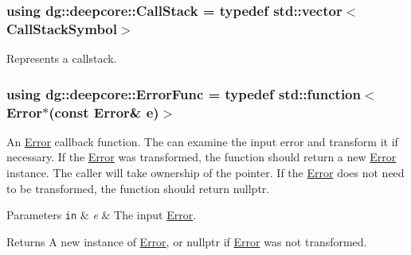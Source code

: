 \subsubsection[{\texorpdfstring{Call\+Stack}{CallStack}}]{\setlength{\rightskip}{0pt plus 5cm}using {\bf dg\+::deepcore\+::\+Call\+Stack} = typedef std\+::vector$<$Call\+Stack\+Symbol$>$}\hypertarget{group___utility_module_gabdf2d70ae3aab3c57142eddec69a725c}{}\label{group___utility_module_gabdf2d70ae3aab3c57142eddec69a725c}


Represents a callstack. 

\subsubsection[{\texorpdfstring{Error\+Func}{ErrorFunc}}]{\setlength{\rightskip}{0pt plus 5cm}using {\bf dg\+::deepcore\+::\+Error\+Func} = typedef std\+::function$<$Error$\ast$(const Error\& e)$>$}\hypertarget{group___utility_module_gaa93ea71a4ed4c044369d3b323aec4435}{}\label{group___utility_module_gaa93ea71a4ed4c044369d3b323aec4435}


An \hyperlink{classdg_1_1deepcore_1_1_error}{Error} callback function. The can examine the input error and transform it if necessary. If the \hyperlink{classdg_1_1deepcore_1_1_error}{Error} was transformed, the function should return a new \hyperlink{classdg_1_1deepcore_1_1_error}{Error} instance. The caller will take ownership of the pointer. If the \hyperlink{classdg_1_1deepcore_1_1_error}{Error} does not need to be transformed, the function should return nullptr. 


\begin{DoxyParams}[1]{Parameters}
\mbox{\tt in}  & {\em e} & The input \hyperlink{classdg_1_1deepcore_1_1_error}{Error}. \\
\hline
\end{DoxyParams}
\begin{DoxyReturn}{Returns}
A new instance of \hyperlink{classdg_1_1deepcore_1_1_error}{Error}, or nullptr if \hyperlink{classdg_1_1deepcore_1_1_error}{Error} was not transformed. 
\end{DoxyReturn}
\subsubsection[{\texorpdfstring{Progress}{Progress}}]{}\hypertarget{group___utility_module_gae07fce8a40a5222a0dcd537a0b28a008}{}\label{group___utility_module_gae07fce8a40a5222a0dcd537a0b28a008}


